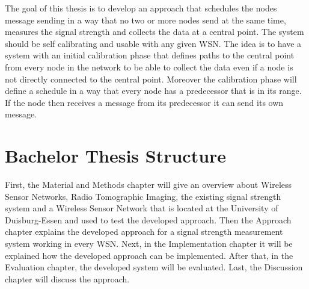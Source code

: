 The goal of this thesis is to develop an approach that schedules the nodes message sending in a way that no two or more nodes send at the same time, measures the signal strength and collects the data at a central point. The system should be self calibrating and usable with any given WSN. The idea is to have a system with an initial calibration phase that defines paths to the central point from every node in the network to be able to collect the data even if a node is not directly connected to the central point. Moreover the calibration phase will define a schedule in a way that every node has a predecessor that is in its range. If the node then receives a message from its predecessor it can send its own message.   


\section{Bachelor Thesis Structure}
First, the Material and Methods chapter will give an overview about Wireless Sensor Networks, Radio Tomographic Imaging, the existing signal strength system and a Wireless Sensor Network that is located at the University of Duisburg-Essen and used to test the developed approach. Then the Approach chapter explains the developed approach for a signal strength measurement system working in every WSN. Next, in the Implementation chapter it will be explained how the developed approach can be implemented. After that, in the Evaluation chapter, the developed system will be evaluated. Last, the Discussion chapter will discuss the approach.